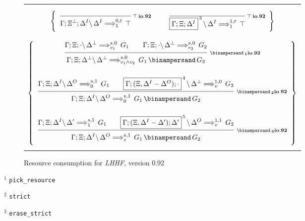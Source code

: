 \begin{figure}[t]
\begin{center}
\begin{tabular}{|c|}
      \\ \\ \\
      $\left\{
        \begin{array}{ccc}
          \ruleI
            {}
            {\ioIXc{\G;\X^\Bot;\D^I}{\D^I}{\Top}{1}{0,t}}
            {\Top \: io.92}
        &
          \hspace{0.5em}
        &
          \ruleI
            {}
            {\ioIXc{\fb{\G;\X;\D^I}{3}}{\D^I}{\Top}{1}{1,t}}
            {\Top \: io.92}
        \end{array}
      \right\}$

      \\ \\ \\
      $\left\{
        \begin{array}{c}
          \ruleII
            {\ioIXc{\G;\X;\cdot}{\D^\bot}{G_1}{v_1}{s,0}}
            {\ioIXc{\G;\X;\cdot}{\D^\Bot}{G_2}{v_2}{s,0}}
            {\ioIXc
              {\G;\X;\D^\bot}{\D^\bot}
              {G_1 \With G_2}
              {v_1 \wedge v_2}{s,0}}
            {\With_1 io.92}
        \\ \\
          \ruleII
            {\ioIXc{\G;\X;\D^I}{\D^O}{G_1}{0}{s,1}}
            {\ioIXc{\fb{\G;(\X,\D^I-\D^O);\cdot}{4}}{\D^\Bot}{G_2}{v}{1,0}}
            {\ioIXc{\G;\X;\D^I}{\D^O}{G_1 \With G_2}{0}{s,1}}
            {\With_2 io.92}
        \\ \\
          \ruleII
            {\ioIXc{\G;\X;\D^I}{\D'}{G_1}{1}{s,1}}
            {\ioIXc{\fb{\G;(\X,\D^I-\D');\D'}{5}}{\D^O}{G_2}{v}{1,1}}
            {\ioIXc{\G;\X;\D^I}{\D^O}{G_1 \With G_2}{v}{s,1}}
            {\With_3 io.92}
        \end{array}
      \right\}$
      \\ \\
      \hline
    \end{tabular}

    \caption{Resource consumption for {\em LHHF}, version 0.92}
    \label{fig:RC_IXc1}
  \end{center}
\end{figure}

\bigskip

$^1$ {\tt pick\_resource}

$^2$ {\tt strict}

$^3$ {\tt erase\_strict}





